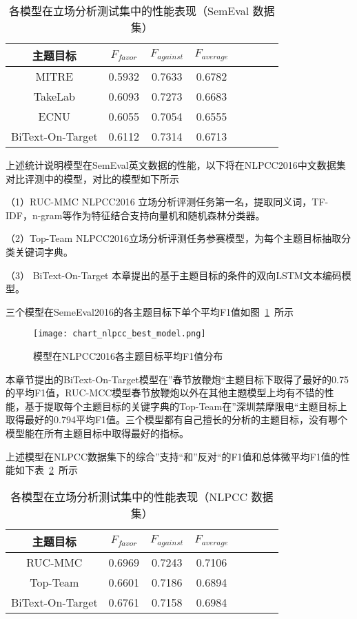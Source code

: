 \begin{table}[htbp]
	\caption[table123]{各模型在立场分析测试集中的性能表现（SemEval 数据集）}
	\vspace{0.5em}\centering\wuhao
	\label{semeval_res}
	\begin{tabular}{cccccccc}
		\toprule[1.5pt]
		主题目标& $F_{favor}$&$F_{against}$&$F_{average}$ \\
		\midrule[1pt]
		MITRE&0.5932&0.7633&0.6782\\
		TakeLab&0.6093&0.7273&0.6683\\
		ECNU&0.6055&0.7054&0.6555\\
		BiText-On-Target&0.6112&0.7314&0.6713\\
		\bottomrule[1.5pt]
	\end{tabular}
\end{table}

上述统计说明模型在SemEval英文数据的性能，以下将在NLPCC2016中文数据集对比评测中的模型，对比的模型如下所示

（1）RUC-MMC NLPCC2016 立场分析评测任务第一名，提取同义词，TF-IDF，n-gram等作为特征结合支持向量机和随机森林分类器。

（2）Top-Team NLPCC2016立场分析评测任务参赛模型，为每个主题目标抽取分类关键词字典。

（3） BiText-On-Target 本章提出的基于主题目标的条件的双向LSTM文本编码模型。

三个模型在SemeEval2016的各主题目标下单个平均F1值如图~\ref{chart_nlpcc_best_model}~所示
\begin{figure}[htbp]
	\centering
	\texttt{[image: chart\_nlpcc\_best\_model.png]}
	\caption[rnn_vanish]{模型在NLPCC2016各主题目标平均F1值分布}
	\label{chart_nlpcc_best_model}
\end{figure}

本章节提出的BiText-On-Target模型在”春节放鞭炮“主题目标下取得了最好的0.75的平均F1值，RUC-MCC模型春节放鞭炮以外在其他主题模型上均有不错的性能，基于提取每个主题目标的关键字典的Top-Team在”深圳禁摩限电“主题目标上取得最好的0.794平均F1值。三个模型都有自己擅长的分析的主题目标，没有哪个模型能在所有主题目标中取得最好的指标。

上述模型在NLPCC数据集下的综合”支持“和”反对“的F1值和总体微平均F1值的性能如下表~\ref{nlpcc_res}~所示
\begin{table}[htbp]
	\caption[table123]{各模型在立场分析测试集中的性能表现（NLPCC 数据集）}
	\label{nlpcc_res}
	\vspace{0.5em}\centering\wuhao
	\begin{tabular}{cccccccc}
		\toprule[1.5pt]
		主题目标& $F_{favor}$&$F_{against}$&$F_{average}$ \\
		\midrule[1pt]
		RUC-MMC&0.6969&0.7243&0.7106\\
		Top-Team&0.6601&0.7186&0.6894\\
		BiText-On-Target&0.6761&0.7158&0.6984\\
		\bottomrule[1.5pt]
	\end{tabular}
\end{table}

